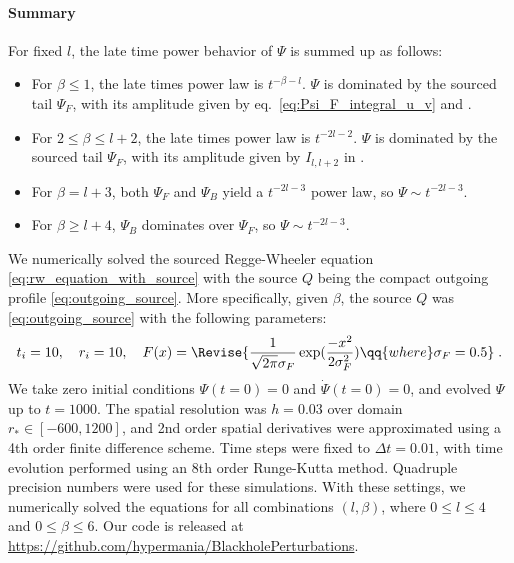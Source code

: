 \paragraph{Summary}
For fixed $l$, the late time power behavior of $\Psi$ is summed up as follows:
\begin{framed}
\begin{itemize}
\item[1.] For $\beta \leq 1$, the late times power law is $t^{-\beta-l}$.
  $\Psi$ is dominated by the sourced tail $\Psi_F$, with its amplitude given by eq.~\eqref{eq:Psi_F_integral_u_v} and .
\item[2.] For $2 \leq \beta \leq l+2$, the late times power law is $t^{-2l-2}$.
  $\Psi$ is dominated by the sourced tail $\Psi_F$, with its amplitude given by $I_{l,l+2}$ in .
\item[3.] For $\beta = l+3$, both $\Psi_F$ and $\Psi_B$ yield a $t^{-2l-3}$ power law, so $\Psi \sim t^{-2l-3}$.
\item[4.] For $\beta \geq l+4$, $\Psi_B$ dominates over $\Psi_F$, so $\Psi \sim t^{-2l-3}$.
\end{itemize}
\end{framed}


\label{sec:sourced_tail_numerical}
We numerically solved the sourced Regge-Wheeler equation \eqref{eq:rw_equation_with_source} with the source $Q$ being the compact outgoing profile \eqref{eq:outgoing_source}.
More specifically, given $\beta$, the source $Q$ was \eqref{eq:outgoing_source} with the following parameters:
\begin{align}
  \label{eq:F_x_definition}
  t_i = 10,\quad r_i = 10,\quad
  F(x) = \Revise{ \frac{1}{\sqrt{2\pi} \sigma_F} \exp(\frac{-x^2}{2 \sigma_F^2}) \qq{where} \sigma_F = 0.5} \;.
\end{align}
We take zero initial conditions $\Psi(t=0)=0$ and $\dot{\Psi}(t=0)=0$, and evolved $\Psi$ up to $t=1000$.
The spatial resolution was $h = 0.03$ over domain $r_* \in [-600,1200]$, and 2nd order spatial derivatives were approximated using a 4th order finite difference scheme.
Time steps were fixed to $\Delta{t} = 0.01$, with time evolution performed using an 8th order Runge-Kutta method.
Quadruple precision numbers were used for these simulations.
With these settings, we numerically solved the equations for all combinations $(l,\beta)$, where $0 \leq l \leq 4$ and $0 \leq \beta \leq 6$.
Our code is released at \url{https://github.com/hypermania/BlackholePerturbations}.


